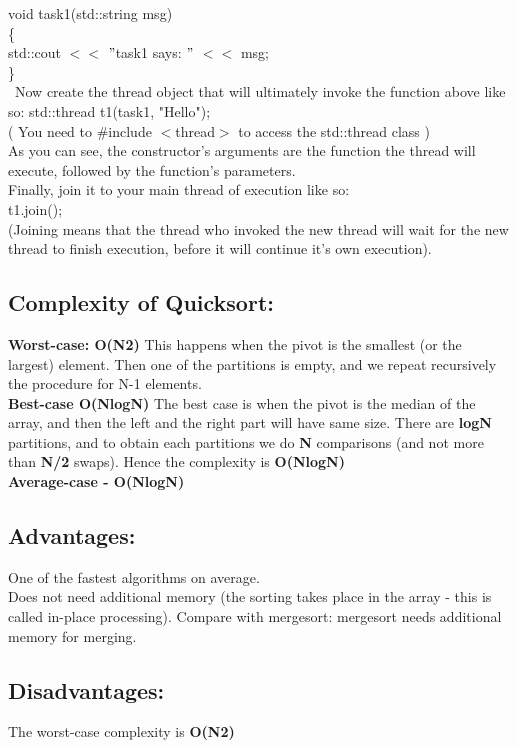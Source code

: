 \documentclass{article}
\begin{document}
	void task1(std::string msg)\\
	\{\ \\
	std::cout $<<$ $"$task1 says: $"$ $<<$ msg; \\
	\}\\\
	Now create the thread object that will ultimately invoke the function above like so:
	std::thread t1(task1, "Hello");\\
	( You need to \#include $<$thread$>$ to access the std::thread class )\\
	As you can see, the constructor's arguments are the function the thread will execute, followed by the function's parameters.\\
	Finally, join it to your main thread of execution like so:\\
	t1.join(); \\
	(Joining means that the thread who invoked the new thread will wait for the new thread to finish execution, before it will continue it's own execution).\\
	
	\subsection{ Complexity of Quicksort:}
	
	\textbf{Worst-case: O(N2)}
	This happens when the pivot is the smallest (or the largest) element. 
	Then one of the partitions is empty, and we repeat recursively the procedure for N-1 elements.\\
	\textbf{Best-case O(NlogN)} The best case is when the pivot is the median of the array, 
	and then the left and the right part will have same size.
	There are \textbf{logN} partitions, and to obtain each partitions we do \textbf{N} comparisons 
	(and not more than \textbf{N/2} swaps). Hence the complexity is \textbf{O(NlogN)}\\
	\textbf{Average-case - O(NlogN)}
	
	\subsection{ Advantages: }
	One of the fastest algorithms on average. \\
	Does not need additional memory (the sorting takes place in the array - this is called in-place processing). Compare with mergesort: mergesort needs additional memory for merging. 
	\subsection{ Disadvantages:}
	The worst-case complexity is \textbf{ O(N2)}
\end{document}
